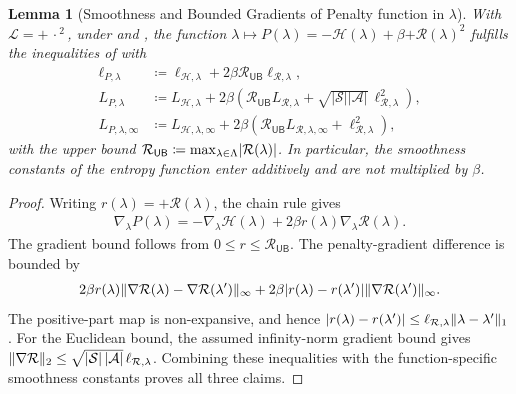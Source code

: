 \documentclass{article}
\theoremstyle{plain}
\newtheorem{lemma}[theorem]{Lemma}
\theoremstyle{definition}
\theoremstyle{remark}
\def\SS{{\mathcal{S}}}
\def\AA{{\mathcal{A}}}
\newcommand{\card}[1]{\left|#1\right|}
\newcommand{\innerEmpty}{\,\cdot\,}
\DeclarePairedDelimiter{\abs}{\lvert}{\rvert}
\DeclarePairedDelimiter{\norm}{\lVert}{\rVert}
\DeclarePairedDelimiter{\plus}{[}{]_{+}}
\newcommand{\pen}[1]{{\plus{#1}^2}}
\newcommand{\penGenNot}{{\mathcal{L}}}
\newcommand{\define}{\coloneqq}
\def\HH{{\mathcal{H}}}
\def\RegMax{{\mathcal{R}_{\mathsf{UB}}}}
\def\Reg{{\mathcal{R}}}
\begin{document}
\begin{lemma}[Smoothness and Bounded Gradients of Penalty
  function in $\lambda$]
 \label{lem:AppendixSmoothnessBoundedGradientsPenaltyLambda}
 With $\penGenNot = \pen{\innerEmpty{}}$, under
  and
 , the
 function $\lambda \mapsto P(\lambda)
  =-\HH(\lambda)+\beta\pen{\Reg(\lambda)}$
 fulfills the inequalities of  with
 \begin{align*}
  \ell_{P,\lambda}
   & \define \ell_{\HH,\lambda}
  +2\beta\RegMax\ell_{\Reg,\lambda},                          \\
  L_{P,\lambda}
   & \define L_{\HH,\lambda}
  +2\beta\left(\RegMax L_{\Reg,\lambda}
  +\sqrt{\card{\SS}\card{\AA}}\,\ell_{\Reg,\lambda}^2\right), \\
  L_{P,\lambda,\infty}
   & \define L_{\HH,\lambda,\infty}
  +2\beta\left(\RegMax L_{\Reg,\lambda,\infty}
  +\ell_{\Reg,\lambda}^2\right),
 \end{align*}
 with the upper bound $\RegMax \define \max_{\lambda \in \Lambda} \abs{\Reg(\lambda)}$.
 In particular, the smoothness constants of the entropy function
 enter additively and are not multiplied by $\beta$.
\end{lemma}
\begin{proof}
 Writing $r(\lambda)=\plus{\Reg(\lambda)}$, the chain rule gives
 \begin{align*}
  \nabla_\lambda P(\lambda)
  =-\nabla_\lambda\HH(\lambda)
  +2\beta r(\lambda)\nabla_\lambda\Reg(\lambda).
 \end{align*}
 The gradient bound follows from $0\leq r\leq\RegMax$.
 The penalty-gradient difference is bounded by
 \begin{align*}
  2\beta r(\lambda)
  \norm{\nabla\Reg(\lambda)-\nabla\Reg(\lambda^\prime)}_\infty
  +2\beta\abs{r(\lambda)-r(\lambda^\prime)}
  \norm{\nabla\Reg(\lambda^\prime)}_\infty.
 \end{align*}
 The positive-part map is non-expansive, and hence
 $\abs{r(\lambda)-r(\lambda^\prime)}
  \leq\ell_{\Reg,\lambda}\norm{\lambda-\lambda^\prime}_1$.
 For the Euclidean bound, the assumed infinity-norm gradient bound gives
 $\norm{\nabla\Reg}_2\leq
  \sqrt{\card{\SS}\card{\AA}}\,\ell_{\Reg,\lambda}$.
 Combining these inequalities with the function-specific smoothness
 constants proves all three claims.
\end{proof}
\end{document}
